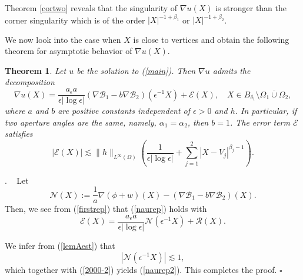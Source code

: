 \documentclass[11pt,a4paper]{article}
\numberwithin{equation}{section}
\newtheorem{thm}{Theorem}[section]
\newcommand{\qed}{\hfill \ensuremath{\square}}
\newcommand{\pf}{\noindent {\sl Proof}. \ }
\newcommand{\norm}[1]{\| #1 \|}
\newcommand{\eqnref}[1]{(\ref {#1})}
\newcommand{\Bcal}{\mathcal{B}}
\newcommand{\Ecal}{\mathcal{E}}
\newcommand{\Ncal}{\mathcal{N}}
\newcommand{\Rcal}{\mathcal{R}}
\newcommand{\Ga}{\alpha}
\newcommand{\Gb}{\beta}
\newcommand{\Gd}{\delta}
\newcommand{\Ge}{\epsilon}
\newcommand{\Gf}{\phi}
\newcommand{\GO}{\Omega}
\newcommand{\beq}{\begin{equation}}
\newcommand{\eeq}{\end{equation}}
\begin{document}
Theorem \ref{cortwo} reveals that the singularity of $\nabla u(X)$ is stronger than the corner singularity which is of the order $|X|^{-1+\Gb_1}$ or $|X|^{-1+\Gb_2}$.


We now look into the case when $X$ is close to vertices and obtain the following theorem for asymptotic behavior of $\nabla u(X)$.

\begin{thm}\label{1st_thm}
Let $u$ be the solution to \eqnref{main}.  Then $\nabla u$ admits the decomposition
\beq\label{naurep}
\nabla u(X) = \frac{a_{\Ge}a}{\Ge |\log \Ge|} (\nabla \Bcal_1 - b \nabla \Bcal_2) ( \Ge^{-1} X ) + \Ecal(X), \quad X \in B_{\Gd_1} \setminus \overline{\GO_1 \cup \GO_2},
\eeq
where $a$ and $b$ are positive constants independent of $\Ge >0$ and $h$. In particular, if two aperture angles are the same, namely, $\Ga_1 = \Ga_2$, then $b=1$. The error term $\Ecal$ satisfies
\beq\label{naurep2}
|\Ecal(X)| \lesssim \norm{h}_{L^{\infty} (\GO)} \left(\frac{1}{\Ge |\log \Ge|} + \sum_{j=1}^2 |X-V_j|^{\Gb_j-1}\right).
\eeq
\end{thm}

\pf
Let
\beq
\Ncal(X) := \frac{1}{a} \nabla (\Gf + w)(X) - \left(\nabla \Bcal_1 - b \nabla \Bcal_2 \right)(X).
\eeq
Then, we see from \eqnref{firstrep} that \eqnref{naurep} holds with
\beq\label{error}
\Ecal(X) = \frac{a_{\Ge}a}{\Ge |\log \Ge|} \Ncal(\Ge^{-1}X) + \Rcal(X).
\eeq

We infer from \eqnref{lemAest} that
$$
|\Ncal(\Ge^{-1}X)| \lesssim 1,
$$
which together with \eqnref{2000-2} yields \eqnref{naurep2}. This completes the proof. \qed
\end{document}
